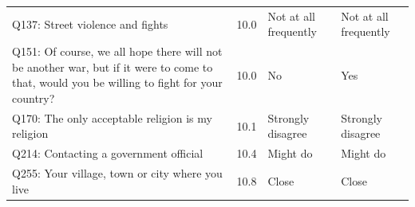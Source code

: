 \begin{tabular}{p{3.1in}lp{1.05in}p{1.05in}}
Q137: Street violence and fights & 10.0 & Not at all frequently & Not at all frequently \\
Q151: Of course, we all hope there will not be another war, but if it were to come to that, would you be willing to fight for your country? & 10.0 & No & Yes \\
Q170: The only acceptable religion is my religion & 10.1 & Strongly disagree & Strongly disagree \\
Q214: Contacting a government official & 10.4 & Might do & Might do \\
Q255: Your village, town or city where you live & 10.8 & Close & Close \\
\bottomrule
\end{tabular}
